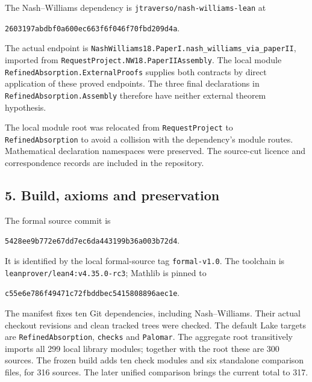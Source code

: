 \documentclass[english,11pt,a4paper]{article}
\begin{document}
The Nash--Williams dependency is \texttt{jtraverso/\allowbreak{}nash-williams-lean} at

\texttt{2603197a\allowbreak{}bdbf0a60\allowbreak{}0ec663f6\allowbreak{}f046f70f\allowbreak{}bd209d4a}.

The actual endpoint is \texttt{Nash\allowbreak{}Williams18.\allowbreak{}Paper\allowbreak{}I.\allowbreak{}nash\_\allowbreak{}williams\_\allowbreak{}via\_\allowbreak{}paper\allowbreak{}II}, imported from \texttt{Request\allowbreak{}Project.\allowbreak{}NW18.\allowbreak{}Paper\allowbreak{}IIAssembly}. The local module \texttt{Refined\allowbreak{}Absorption.\allowbreak{}External\allowbreak{}Proofs} supplies both contracts by direct application of these proved endpoints. The three final declarations in \texttt{Refined\allowbreak{}Absorption.\allowbreak{}Assembly} therefore have neither external theorem hypothesis.

The local module root was relocated from \texttt{Request\allowbreak{}Project} to \texttt{Refined\allowbreak{}Absorption} to avoid a collision with the dependency's module routes. Mathematical declaration namespaces were preserved. The source-cut licence and correspondence records are included in the repository.

\subsection{5. Build, axioms and preservation}\label{build-axioms-and-preservation}

The formal source commit is

\texttt{5428ee9b\allowbreak{}772e67dd\allowbreak{}7ec6da44\allowbreak{}3199b36a\allowbreak{}003b72d4}.

It is identified by the local formal-source tag \texttt{formal-v1.\allowbreak{}0}. The toolchain is \texttt{leanprover/\allowbreak{}lean4:v4.\allowbreak{}35.\allowbreak{}0-rc3}; Mathlib is pinned to

\texttt{c55e6e78\allowbreak{}6f49471c\allowbreak{}72fbddbe\allowbreak{}c5415808\allowbreak{}896aec1e}.

The manifest fixes ten Git dependencies, including Nash--Williams. Their actual checkout revisions and clean tracked trees were checked. The default Lake targets are \texttt{Refined\allowbreak{}Absorption}, \texttt{checks} and \texttt{Palomar}. The aggregate root transitively imports all 299 local library modules; together with the root these are 300 sources. The frozen build adds ten check modules and six standalone comparison files, for 316 sources. The later unified comparison brings the current total to 317.
\end{document}
